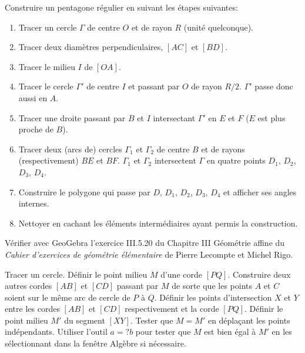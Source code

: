 \begin{exercice}
Construire un pentagone régulier en suivant les étapes
suivantes:
\begin{enumerate}
\item    Tracer un cercle $\Gamma$ de centre $O$ et de rayon $R$ (unité quelconque).
\item    Tracer deux diamètres perpendiculaires, $[AC]$ et $[BD]$.
\item    Tracer le milieu $I$ de $[OA]$.
\item    Tracer le cercle $\Gamma'$ de centre $I$ et passant par $O$ de rayon $R/2$. $\Gamma'$ passe donc aussi en $A$.
\item    Tracer une droite passant par $B$ et $I$ intersectant $\Gamma'$ en $E$ et $F$ ($E$ est plus proche de $B$).
\item    Tracer deux (arcs de) cercles $\Gamma_1$ et $\Gamma_2$ de centre $B$ et de rayons
(respectivement) $BE$ et $BF$.  $\Gamma_1$ et $\Gamma_2$ intersectent $\Gamma$
en quatre points $D_1$, $D_2$, $D_3$, $D_4$.
\item Construire le polygone qui passe par $D$, $D_1$, $D_2$, $D_3$,
$D_4$ et afficher ses angles internes.
\item Nettoyer en cachant les éléments intermédiaires ayant permis la
construction.
\end{enumerate}
\end{exercice}

\begin{exercice}
Vérifier avec GeoGebra l'exercice III.5.20 du Chapitre III Géométrie affine du
\emph{Cahier d'exercices de géométrie élémentaire} de Pierre Lecompte et Michel
Rigo.
\end{exercice}


\begin{exercice}[Théorème du papillon]
Tracer un cercle. Définir le point milieu $M$ d'une corde $[PQ]$. Construire deux
autres cordes $[AB]$ et $[CD]$ passant par $M$ de sorte que les points $A$ et
$C$ soient sur le même arc de cercle de $P$ à $Q$. Définir les points
d'intersection $X$ et $Y$ entre les cordes 
$[AB]$ et $[CD]$ respectivement et la corde $[PQ]$.
Définir le point milieu $M'$ du segment $[XY]$.
Tester que $M=M'$ en déplaçant les points indépendants.
Utiliser l'outil $a=?b$ pour tester que $M$ est bien égal à $M'$ en les
sélectionnant dans la fenêtre Algèbre si nécessaire.
\end{exercice}


